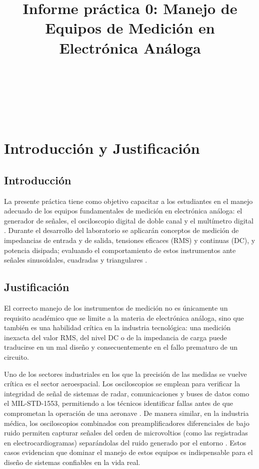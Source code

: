 \documentclass[journal, a4paper]{IEEEtran}
\title{Informe práctica 0: Manejo de Equipos de Medición en Electrónica Análoga}
\author{
    \IEEEauthorblockN{Juan José Tobar Álvarez}{\textit{ jutobara@unal.edu.co}} \\
    \and
    \IEEEauthorblockN{David Alejandro Montes Rodríguez}{\textit{ dmontesr@unal.edu.co}} \\
    \and
    \IEEEauthorblockN{Jean Sebastian Claros Araujo}{\textit{ jclarosa@unal.edu.co}} \\
}
\begin{document}
\maketitle

\section{Introducción y Justificación}

\subsection{Introducción}
La presente práctica tiene como objetivo capacitar a los estudiantes en el manejo adecuado de los equipos fundamentales de medición en electrónica análoga: el generador de señales, el osciloscopio digital de doble canal y el multímetro digital \cite{guia_practica0}. Durante el desarrollo del laboratorio se aplicarán conceptos de medición de impedancias de entrada y de salida, tensiones eficaces (RMS) y continuas (DC), y potencia disipada; evaluando el comportamiento de estos instrumentos ante señales sinusoidales, cuadradas y triangulares \cite{sedra2020}.

\subsection{Justificación}
El correcto manejo de los instrumentos de medición no es únicamente un requisito académico que se limite a la materia de electrónica análoga, sino que también es una habilidad crítica en la industria tecnológica: una medición inexacta del valor RMS, del nivel DC o de la impedancia de carga puede traducirse en un mal diseño y consecuentemente en el fallo prematuro de un circuito. 

Uno de los sectores industriales en los que la precisión de las medidas se vuelve crítica es el sector aeroespacial. Los osciloscopios se emplean para verificar la integridad de señal de sistemas de radar, comunicaciones y buses de datos como el MIL-STD-1553, permitiendo a los técnicos identificar fallas antes de que comprometan la operación de una aeronave \cite{militaryaerospace_scopes,pilotjohn_scopes}. De manera similar, en la industria médica, los osciloscopios combinados con preamplificadores diferenciales de bajo ruido permiten capturar señales del orden de microvoltios (como las registradas en electrocardiogramas) separándolas del ruido generado por el entorno \cite{tektronix_biomedical}. Estos casos evidencian que dominar el manejo de estos equipos es indispensable para el diseño de sistemas confiables en la vida real.
\end{document}
